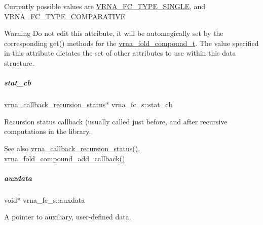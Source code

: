 Currently possible values are \hyperlink{group__fold__compound_gga01a4ff86fa71deaaa5d1abbd95a1447da7e264dd3cf2dc9b6448caabcb7763cd6}{V\+R\+N\+A\+\_\+\+F\+C\+\_\+\+T\+Y\+P\+E\+\_\+\+S\+I\+N\+G\+LE}, and \hyperlink{group__fold__compound_gga01a4ff86fa71deaaa5d1abbd95a1447dab821ce46ea3cf665be97df22a76f5023}{V\+R\+N\+A\+\_\+\+F\+C\+\_\+\+T\+Y\+P\+E\+\_\+\+C\+O\+M\+P\+A\+R\+A\+T\+I\+VE} \begin{DoxyWarning}{Warning}
Do not edit this attribute, it will be automagically set by the corresponding get() methods for the \hyperlink{group__fold__compound_ga1b0cef17fd40466cef5968eaeeff6166}{vrna\+\_\+fold\+\_\+compound\+\_\+t}. The value specified in this attribute dictates the set of other attributes to use within this data structure. 
\end{DoxyWarning}
\mbox{\label{group__fold__compound_a87a83f6795b569000efcbe65acc3dd81}} 
\subparagraph{\texorpdfstring{stat\+\_\+cb}{stat\_cb}}
{\footnotesize\ttfamily \hyperlink{group__fold__compound_gac86036fa8cad1108832335063243cdc8}{vrna\+\_\+callback\+\_\+recursion\+\_\+status}$\ast$ vrna\+\_\+fc\+\_\+s\+::stat\+\_\+cb}



Recursion status callback (usually called just before, and after recursive computations in the library. 

\begin{DoxySeeAlso}{See also}
\hyperlink{group__fold__compound_gac86036fa8cad1108832335063243cdc8}{vrna\+\_\+callback\+\_\+recursion\+\_\+status()}, \hyperlink{group__fold__compound_ga680ddfe1e67d1459689b1e92c80b9c4c}{vrna\+\_\+fold\+\_\+compound\+\_\+add\+\_\+callback()} 
\end{DoxySeeAlso}
\mbox{\label{group__fold__compound_a20048e0c369e9f24b55423d600037c68}} 
\subparagraph{\texorpdfstring{auxdata}{auxdata}}
{\footnotesize\ttfamily void$\ast$ vrna\+\_\+fc\+\_\+s\+::auxdata}



A pointer to auxiliary, user-\/defined data. 

